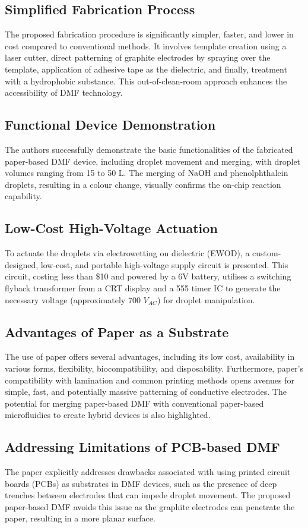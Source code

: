 \subsection{Simplified Fabrication Process}
The proposed fabrication procedure is significantly simpler, faster, and lower in cost compared to conventional methods. It involves template creation using a laser cutter, direct patterning of graphite electrodes by spraying over the template, application of adhesive tape as the dielectric, and finally, treatment with a hydrophobic substance. This out-of-clean-room approach enhances the accessibility of DMF technology.

\subsection{Functional Device Demonstration} 
The authors successfully demonstrate the basic functionalities of the fabricated paper-based DMF device, including droplet movement and merging, with droplet volumes ranging from 15 to 50 \textmugreek L. The merging of \(\ce{NaOH}\) and phenolphthalein droplets, resulting in a colour change, visually confirms the on-chip reaction capability.

\subsection{Low-Cost High-Voltage Actuation} 
To actuate the droplets via electrowetting on dielectric (EWOD), a custom-designed, low-cost, and portable high-voltage supply circuit is presented. This circuit, costing less than \$10 and powered by a 6V battery, utilises a switching flyback transformer from a CRT display and a 555 timer IC to generate the necessary voltage (approximately 700 $V_{AC}$) for droplet manipulation.

\subsection{Advantages of Paper as a Substrate} The use of paper offers several advantages, including its low cost, availability in various forms, flexibility, biocompatibility, and disposability. Furthermore, paper's compatibility with lamination and common printing methods opens avenues for simple, fast, and potentially massive patterning of conductive electrodes. The potential for merging paper-based DMF with conventional paper-based microfluidics to create hybrid devices is also highlighted.

\subsection{Addressing Limitations of PCB-based DMF}
The paper explicitly addresses drawbacks associated with using printed circuit boards (PCBs) as substrates in DMF devices, such as the presence of deep trenches between electrodes that can impede droplet movement. The proposed paper-based DMF avoids this issue as the graphite electrodes can penetrate the paper, resulting in a more planar surface.

